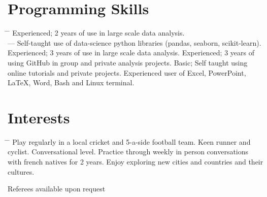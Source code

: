 \documentclass[10pt]{article} %
\begin{document}
\vspace{-3mm}
\section{Programming Skills}
\begin{tabbing}
  \hspace{2mm} \= \hspace{18mm} \= \kill 
        {Experienced; 2 years of use in large scale data analysis.\\
                       \>\> --- Self-taught use of data-science python libraries (pandas, seaborn, scikit-learn).}
           {Experienced; 3 years of use in large scale data analysis.}
           {Experienced; 3 years of using GitHub in group and private analysis projects.}
           {Basic; Self taught using online tutorials and private projects.}
         {Experienced user of Excel, PowerPoint, LaTeX, Word, Bash and Linux terminal.}
\end{tabbing}



\vspace{-9mm}
\section{Interests}

\begin{tabbing}
  \hspace{2mm} \= \hspace{18mm} \= \kill 
     {Play regularly in a local cricket and 5-a-side football team. Keen runner and cyclist.}
     {Conversational level. Practice through weekly in person conversations with french natives for 2 years.}
     {Enjoy exploring new cities and countries and their cultures.}
\end{tabbing}

\vspace{-4mm}
Referees available upon request
\end{document}
